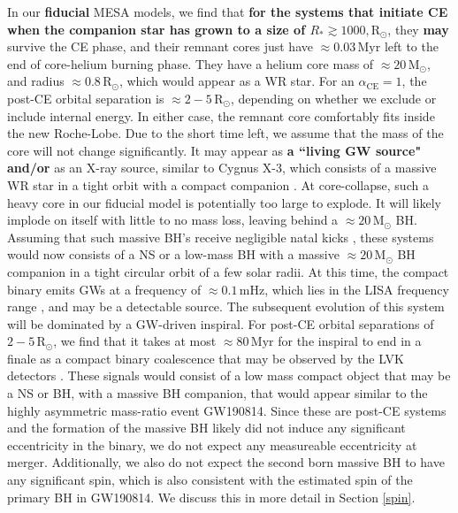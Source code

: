 \documentclass[linenumbers,trackchanges,twocolumn]{aastex701}
\newcommand{\Mdot}{\mathrm{M}_{\odot}}
\newcommand{\Rdot}{\mathrm{R}_{\odot}}
\begin{document}
In our \textbf{fiducial} \textsc{MESA} models, we find that \textbf{for the systems that initiate CE when the companion star has grown to a size of $R_* \gtrsim 1000,\Rdot$}, they \textbf{may} survive the CE phase, and their remnant cores just have $\approx 0.03\,\mathrm{Myr}$ left to the end of core-helium burning phase. They have a helium core mass of $\approx 20\,\Mdot$, and radius $\approx 0.8\,\Rdot$, which would appear as a WR star. For an $\alpha_{\mathrm{CE}} = 1$, the post-CE orbital separation is $\approx 2-5\,\Rdot$, depending on whether we exclude or include internal energy. In either case, the remnant core comfortably fits inside the new Roche-Lobe. Due to the short time left, we assume that the mass of the core will not change significantly. It may appear as \textbf{a ``living GW source" \citep{2020ApJ...904...56G} and/or} as an X-ray source, similar to Cygnus X-3, which consists of a massive WR star in a tight orbit with a compact companion \citep[e.g.,][]{2013ApJ...764...96B,2024NatAs...8.1031V}. At core-collapse, such a heavy core in our fiducial model is potentially too large to explode. It will likely implode on itself with little to no mass loss, leaving behind a $\approx 20\,\Mdot$ BH. Assuming that such massive BH's receive negligible natal kicks \citep{2022NatAs...6.1085S}, these systems would now consists of a NS or a low-mass BH with a massive $\approx 20\,\Mdot$ BH companion in a tight circular orbit of a few solar radii. At this time, the compact binary emits GWs at a frequency of $\approx 0.1\,\mathrm{mHz}$, which lies in the LISA frequency range \citep{2023LRR....26....2A}, and may be a detectable source. The subsequent evolution of this system will be dominated by a GW-driven inspiral. For post-CE orbital separations of $2-5\,\Rdot$, we find that it takes at most $\approx 80\,\mathrm{Myr}$ for the inspiral to end in a finale as a compact binary coalescence that may be observed by the LVK detectors \citep{Peters:1963ux}. These signals would consist of a low mass compact object that may be a NS or BH, with a massive BH companion, that would appear similar to the highly asymmetric mass-ratio event GW190814. Since these are post-CE systems and the formation of the massive BH likely did not induce any significant eccentricity in the binary, we do not expect any measureable eccentricity at merger. Additionally, we also do not expect the second born massive BH to have any significant spin, which is also consistent with the estimated spin of the primary BH in GW190814. We discuss this in more detail in Section \ref{spin}.
\end{document}
